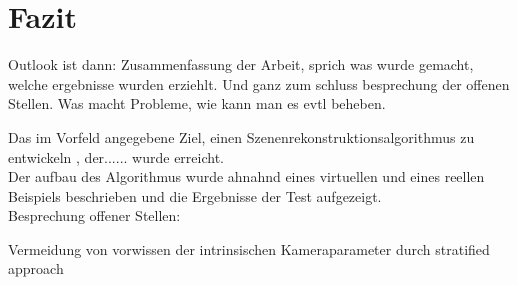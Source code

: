\chapter{Fazit}



Outlook ist dann: Zusammenfassung der Arbeit, sprich was wurde gemacht, welche ergebnisse wurden erziehlt. Und  ganz zum schluss besprechung der offenen Stellen. Was macht Probleme, wie kann man es evtl beheben.



Das im Vorfeld angegebene Ziel, einen Szenenrekonstruktionsalgorithmus zu entwickeln , der...... wurde erreicht.\\

Der aufbau des Algorithmus wurde ahnahnd eines virtuellen und eines reellen Beispiels beschrieben und die Ergebnisse der Test aufgezeigt.\\














Besprechung offener Stellen:

Vermeidung von vorwissen der intrinsischen Kameraparameter durch stratified approach